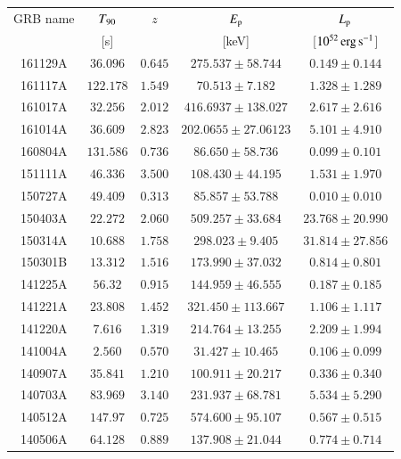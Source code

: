 \begin{longtable}{|c|c|c|c|c|}
\hline
GRB name & $T_{\rm{90}}$ & $z$ & $E_{\rm p}$ & $L_{\rm p}$ \\
 & [s] &  & [keV] & [$10^{52} \, \rm erg \, s^{-1}$] \\
\hline
\hline
161129A & $  36.096 $ & $ 0.645 $ & $ 275.537 \pm 58.744 $ & $ 0.149 \pm 0.144$ \\
\hline
161117A & $ 122.178 $ & $ 1.549 $ & $  70.513 \pm  7.182 $ & $ 1.328 \pm 1.289 $ \\
\hline
161017A & $  32.256 $ & $ 2.012 $ & $ 416.6937 \pm 138.027 $ & $ 2.617 \pm 2.616 $ \\
\hline
161014A & $  36.609 $ & $ 2.823 $ & $ 202.0655 \pm  27.06123$ & $ 5.101 \pm 4.910 $ \\
\hline
160804A & $ 131.586 $ & $ 0.736 $ & $  86.650 \pm  58.736 $ & $  0.099 \pm  0.101 $ \\
\hline
151111A & $  46.336 $ & $ 3.500 $ & $ 108.430 \pm  44.195 $ & $  1.531 \pm  1.970 $ \\
\hline
150727A & $  49.409 $ & $ 0.313 $ & $  85.857 \pm  53.788 $ & $  0.010 \pm  0.010 $ \\
\hline
150403A & $  22.272 $ & $ 2.060 $ & $ 509.257 \pm  33.684 $ & $ 23.768 \pm 20.990 $ \\
\hline
150314A & $  10.688 $ & $ 1.758 $ & $ 298.023 \pm   9.405 $ & $ 31.814 \pm 27.856 $ \\
\hline
150301B & $  13.312 $ & $ 1.516 $ & $ 173.990 \pm  37.032 $ & $  0.814 \pm  0.801 $ \\
\hline
141225A & $   56.32 $ & $ 0.915 $ & $ 144.959 \pm  46.555 $ & $  0.187 \pm  0.185 $ \\
\hline
141221A & $  23.808 $ & $ 1.452 $ & $ 321.450 \pm 113.667 $ & $  1.106 \pm  1.117 $ \\
\hline
141220A & $   7.616 $ & $ 1.319 $ & $ 214.764 \pm  13.255 $ & $  2.209 \pm  1.994 $ \\
\hline
141004A & $    2.560 $ & $ 0.570 $ & $  31.427 \pm  10.465 $ & $  0.106 \pm  0.099 $ \\
\hline
140907A & $  35.841 $ & $ 1.210 $ & $ 100.911 \pm  20.217 $ & $  0.336 \pm  0.340 $ \\
\hline
140703A & $  83.969 $ & $ 3.140 $ & $ 231.937 \pm  68.781 $ & $  5.534 \pm  5.290 $ \\
\hline
140512A & $  147.97 $ & $ 0.725 $ & $ 574.600 \pm  95.107 $ & $  0.567 \pm  0.515 $ \\
\hline
140506A & $  64.128 $ & $ 0.889 $ & $ 137.908 \pm  21.044 $ & $  0.774 \pm  0.714 $ \\

\end{longtable}
